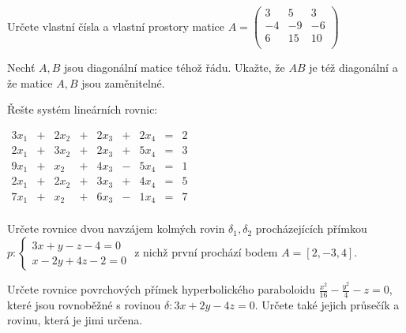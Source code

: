 \begin{questions}

\question Určete vlastní čísla a vlastní prostory matice \(A = \begin{pmatrix}
    3  & 5  & 3\\
    -4 & -9 & -6\\
    6  & 15 & 10\\
\end{pmatrix}\)

\question Nechť \(A,B\) jsou diagonální matice téhož řádu. Ukažte, že \(AB\) je též diagonální a že matice \(A,B\) jsou zaměnitelné.

\newpage

\question Řešte systém lineárních rovnic: \begin{center}
    \(\begin{matrix}
        3x_1 & + & 2x_2 & + & 2x_3 & + & 2x_4 & = & 2 \\
        2x_1 & + & 3x_2 & + & 2x_3 & + & 5x_4 & = & 3 \\
        9x_1 & + &  x_2 & + & 4x_3 & - & 5x_4 & = & 1 \\
        2x_1 & + & 2x_2 & + & 3x_3 & + & 4x_4 & = & 5 \\
        7x_1 & + &  x_2 & + & 6x_3 & - & 1x_4 & = & 7 \\
    \end{matrix}\)
\end{center}

\question Určete rovnice dvou navzájem kolmých rovin \(\delta_1, \delta_2\) procházejících přímkou \(p: \left\{
    \begin{array}{l}
        3x + y - z -4 = 0\\
        x - 2y + 4z - 2 = 0
    \end{array}
\right.\) z nichž první prochází bodem \(A=[ 2, -3, 4 ]\).

\newpage

\question Určete rovnice povrchových přímek hyperbolického paraboloidu \(\frac{x^2}{16}-\frac{y^2}{4}-z = 0\), které jsou rovnoběžné s rovinou \(\delta: 3x + 2y - 4z = 0\). Určete také jejich průsečík a rovinu, která je jimi určena.
\end{questions}
